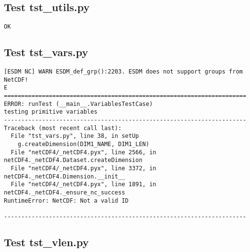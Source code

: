\subsection{Test tst\_utils.py}

\begin{verbatim}
OK
\end{verbatim}

\subsection{Test tst\_vars.py}

\begin{verbatim}
[ESDM NC] WARN ESDM_def_grp():2203. ESDM does not support groups from NetCDF!
E
======================================================================
ERROR: runTest (__main__.VariablesTestCase)
testing primitive variables
----------------------------------------------------------------------
Traceback (most recent call last):
  File "tst_vars.py", line 38, in setUp
    g.createDimension(DIM1_NAME, DIM1_LEN)
  File "netCDF4/_netCDF4.pyx", line 2566, in netCDF4._netCDF4.Dataset.createDimension
  File "netCDF4/_netCDF4.pyx", line 3372, in netCDF4._netCDF4.Dimension.__init__
  File "netCDF4/_netCDF4.pyx", line 1891, in netCDF4._netCDF4._ensure_nc_success
RuntimeError: NetCDF: Not a valid ID

----------------------------------------------------------------------
\end{verbatim}

\subsection{Test tst\_vlen.py}

